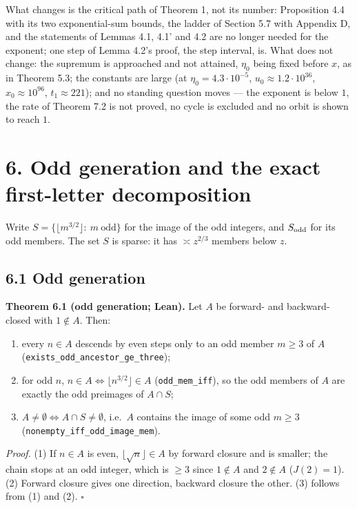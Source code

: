 \documentclass[11pt,a4paper]{article}
\providecommand{\tightlist}{\setlength{\itemsep}{0pt}\setlength{\parskip}{0pt}}
\begin{document}
What changes is the critical path of Theorem 1, not its number:
Proposition 4.4 with its two exponential-sum bounds, the ladder of
Section 5.7 with Appendix D, and the statements of Lemmas 4.1, 4.1' and
4.2 are no longer needed for the exponent; one step of Lemma 4.2's
proof, the step interval, is. What does not change: the supremum is
approached and not attained, \(\eta_0\) being fixed before \(x\), as in
Theorem 5.3; the constants are large (at \(\eta_0=4.3\cdot10^{-5}\),
\(u_0\approx1.2\cdot10^{36}\), \(x_0\approx10^{96}\),
\(t_1\approx221\)); and no standing question moves --- the exponent is
below \(1\), the rate of Theorem 7.2 is not proved, no cycle is excluded
and no orbit is shown to reach \(1\).

\section{6. Odd generation and the exact first-letter
decomposition}\label{odd-generation-and-the-exact-first-letter-decomposition}

Write \(S=\{\lfloor m^{3/2}\rfloor:\ m\ \text{odd}\}\) for the image of
the odd integers, and \(S_{\rm odd}\) for its odd members. The set \(S\)
is sparse: it has \(\asymp z^{2/3}\) members below \(z\).

\subsection{6.1 Odd generation}\label{odd-generation}

\textbf{Theorem 6.1 (odd generation; Lean).} Let \(A\) be forward- and
backward-closed with \(1\notin A\). Then:

\begin{enumerate}
\def\labelenumi{\arabic{enumi}.}
\tightlist
\item
  every \(n\in A\) descends by even steps only to an odd member
  \(m\ge 3\) of \(A\)
  (\texttt{\nolinkurl{exists_odd_ancestor_ge_three}});
\item
  for odd \(n\), \(n\in A\iff\lfloor n^{3/2}\rfloor\in A\)
  (\texttt{\nolinkurl{odd_mem_iff}}), so the odd members of \(A\) are
  exactly the odd preimages of \(A\cap S\);
\item
  \(A\ne\emptyset\iff A\cap S\ne\emptyset\), i.e.~\(A\) contains the
  image of some odd \(m\ge 3\)
  (\texttt{\nolinkurl{nonempty_iff_odd_image_mem}}).
\end{enumerate}

\emph{Proof.} (1) If \(n\in A\) is even, \(\lfloor\sqrt n\rfloor\in A\)
by forward closure and is smaller; the chain stops at an odd integer,
which is \(\ge 3\) since \(1\notin A\) and \(2\notin A\) (\(J(2)=1\)).
(2) Forward closure gives one direction, backward closure the other. (3)
follows from (1) and (2). \(\square\)
\end{document}
